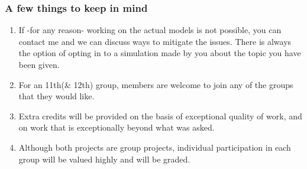 \documentclass[11pt,addpoints]{exam}
\begin{document}
\begin{questions}
		\subsubsection*{A few things to keep in mind}
		\begin{enumerate}
			\item If -for any reason- working on the actual models is not possible, you can contact me and we can discuss ways to mitigate the issues. There is always the option of opting in to a simulation made by you about the topic you have been given.
			\item For an 11th(\& 12th) group, members are welcome to join any of the groups that they would like. 
			\item Extra credits will be provided on the basis of exceptional quality of work, and on work that is exceptionally beyond what was asked. 	
			\item Although both projects are group projects, individual participation in each group will be valued highly and will be graded.
		\end{enumerate}
		
			
	\end{questions}		
\end{document}
